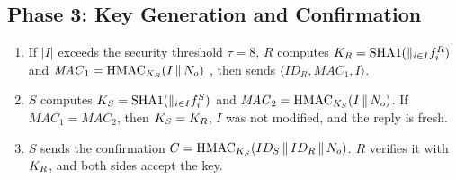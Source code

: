\subsection{Phase 3: Key Generation and Confirmation}
\begin{enumerate}
  \item If $|I|$ exceeds the security threshold $\tau = 8$, $R$ computes $K_R = \mathrm{SHA1}(\Vert_{i\in I} f^R_i)$ and $\mathit{MAC}_1 = \mathrm{HMAC}_{K_R}(I \,\Vert\, N_o)$ \cite{rfc2104}, then sends $\langle ID_R, \mathit{MAC}_1, I\rangle$.
  \item $S$ computes $K_S = \mathrm{SHA1}(\Vert_{i\in I} f^S_i)$ and $\mathit{MAC}_2 = \mathrm{HMAC}_{K_S}(I \,\Vert\, N_o)$. If $\mathit{MAC}_1 = \mathit{MAC}_2$, then $K_S = K_R$, $I$ was not modified, and the reply is fresh.
  \item $S$ sends the confirmation $C = \mathrm{HMAC}_{K_S}(ID_S \,\Vert\, ID_R \,\Vert\, N_o)$. $R$ verifies it with $K_R$, and both sides accept the key.
\end{enumerate}

